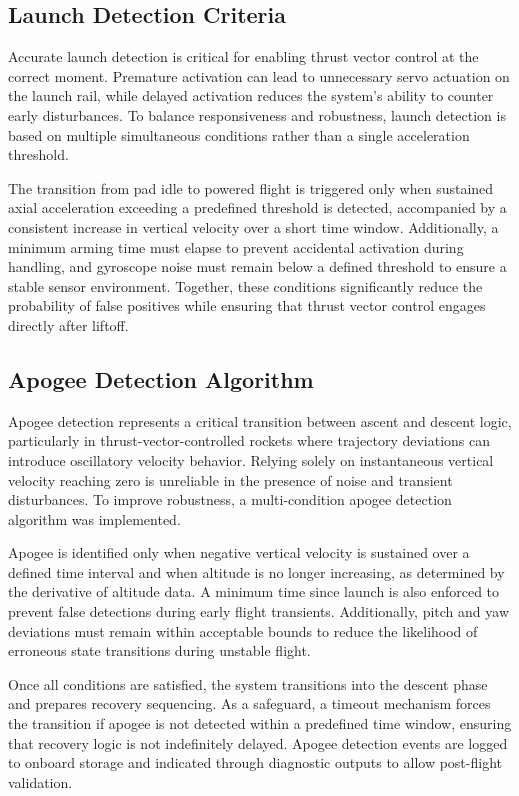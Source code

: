 \subsection{Launch Detection Criteria}

Accurate launch detection is critical for enabling thrust vector control at the correct moment. Premature activation can lead to unnecessary servo actuation on the launch rail, while delayed activation reduces the system’s ability to counter early disturbances. To balance responsiveness and robustness, launch detection is based on multiple simultaneous conditions rather than a single acceleration threshold.

The transition from pad idle to powered flight is triggered only when sustained axial acceleration exceeding a predefined threshold is detected, accompanied by a consistent increase in vertical velocity over a short time window. Additionally, a minimum arming time must elapse to prevent accidental activation during handling, and gyroscope noise must remain below a defined threshold to ensure a stable sensor environment. Together, these conditions significantly reduce the probability of false positives while ensuring that thrust vector control engages directly after liftoff.


\subsection{Apogee Detection Algorithm}

Apogee detection represents a critical transition between ascent and descent logic, particularly in thrust-vector-controlled rockets where trajectory deviations can introduce oscillatory velocity behavior. Relying solely on instantaneous vertical velocity reaching zero is unreliable in the presence of noise and transient disturbances. To improve robustness, a multi-condition apogee detection algorithm was implemented.

Apogee is identified only when negative vertical velocity is sustained over a defined time interval and when altitude is no longer increasing, as determined by the derivative of altitude data. A minimum time since launch is also enforced to prevent false detections during early flight transients. Additionally, pitch and yaw deviations must remain within acceptable bounds to reduce the likelihood of erroneous state transitions during unstable flight.

Once all conditions are satisfied, the system transitions into the descent phase and prepares recovery sequencing. As a safeguard, a timeout mechanism forces the transition if apogee is not detected within a predefined time window, ensuring that recovery logic is not indefinitely delayed. Apogee detection events are logged to onboard storage and indicated through diagnostic outputs to allow post-flight validation.



